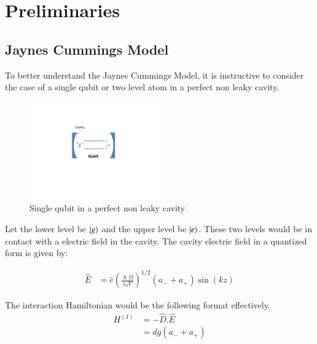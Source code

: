 \newcommand{\etas}{\ensuremath{\eta_{\mathrm{s}}}}


\chapter{Preliminaries}
\section{Jaynes Cummings Model}
To better understand the Jaynes Cummings Model, it is instructive to consider the case of a single qubit or two level atom in a perfect non leaky cavity.
\citep{gerry2005introductory}

\begin{figure}
\centering
\includegraphics[width=0.5\textwidth]{Figr2a.pdf}
\caption{Single qubit in a perfect non leaky cavity}
\label{fig:Figr2a}
\end{figure}

Let the lower level be $\ket{g}$ and the upper level be $\ket{e}$. These two levels would be in contact with a electric field in the cavity. The cavity electric field in a quantized form is given by: 

\begin{align}\label{eq:3}
\hat { E } &=\hat{e}{ \left( \frac { \hslash \Omega  }{ { \epsilon  }_{ 0 }V }  \right)  }^{ { 1 }/{ 2 } }\left( {  a _{-} }+{  a  }_{ +  } \right) \sin { \left( kz \right) }
\end{align}

The interaction Hamiltonian would be the following format effectively.
\begin{align}\label{eq:4}
{ H  }^{ \left( I \right)  }&= -\hat{D} {.} \hat{E}  \\
&=d g\left( {  a_{-}  }+{  a  }_{ +  } \right)
\end{align}

